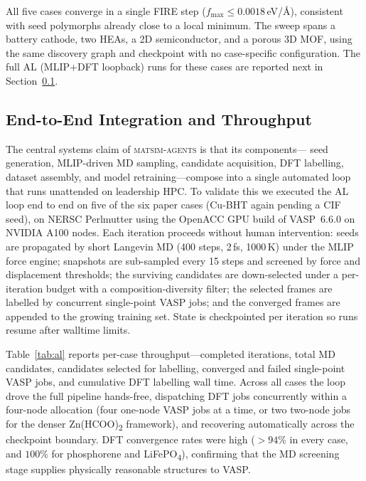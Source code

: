 \documentclass[conference]{IEEEtran}
\def\acs#1{#1}%
\begin{document}
All five cases converge in a single \acs{FIRE} step
($f_\text{max} \le 0.0018$\,eV/\AA), consistent with seed polymorphs already
close to a local minimum.
The sweep spans a battery cathode, two \acsp{HEA}, a 2D semiconductor, and a
porous 3D \acs{MOF}, using the same discovery graph and checkpoint with no case-specific
configuration. The full \acs{AL} (\acs{MLIP}+\acs{DFT} loopback) runs
for these cases are reported next in
Section~\ref{sec:results:al}.

\subsection{End-to-End Integration and Throughput}
\label{sec:results:al}
The central systems claim of \textsc{matsim-agents} is that its components---
seed generation, \acs{MLIP}-driven \acs{MD} sampling, candidate
acquisition, \acs{DFT} labelling, dataset assembly, and model
retraining---compose into a single automated loop that runs unattended on
leadership \acs{HPC}. To validate this we executed the \acs{AL} loop
end to end on five of the six paper cases (Cu-BHT again pending a \acs{CIF}
seed), on \acs{NERSC} Perlmutter using the OpenACC \acs{GPU} build of
\acs{VASP}~6.6.0 on NVIDIA A100 nodes. Each iteration proceeds without human
intervention: seeds are propagated by short Langevin \acs{MD} (400 steps,
2\,fs, 1000\,K) under the \acs{MLIP} force engine; snapshots are sub-sampled
every 15 steps and screened by force and displacement thresholds; the surviving
candidates are down-selected under a per-iteration
budget with a composition-diversity filter; the selected frames are labelled by
concurrent single-point \acs{VASP} jobs; and the converged frames are appended
to the growing training set. State is checkpointed per iteration so runs resume
after walltime limits.

Table~\ref{tab:al} reports per-case throughput---completed iterations, total
\acs{MD} candidates, candidates selected for labelling, converged and failed
single-point \acs{VASP} jobs, and cumulative \acs{DFT} labelling wall time.
Across all cases the loop drove
the full pipeline hands-free, dispatching \acs{DFT} jobs concurrently within a
four-node allocation (four one-node \acs{VASP} jobs at a time, or two two-node
jobs for the denser Zn(HCOO)\textsubscript{2} framework), and recovering
automatically across the checkpoint boundary. \acs{DFT} convergence rates were
high (\(>94\%\) in every case, and \(100\%\) for phosphorene and
LiFePO\textsubscript{4}), confirming that the \acs{MD} screening stage supplies
physically reasonable structures to \acs{VASP}.
\end{document}
